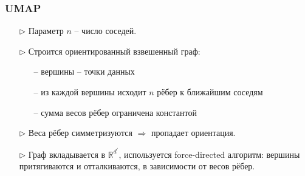 \documentclass[unicode]{beamer}
\begin{document}
\begin{frame}[t]
\frametitle{UMAP}
\begin{itemize}
\item[$\rhd$] Параметр $n$ -- число соседей.
\item[$\rhd$] Строится ориентированный взвешенный граф:
  \begin{itemize}
  \item[--] вершины -- точки данных
  \item[--] из каждой вершины исходит $n$ рёбер к ближайшим соседям
  \item[--] сумма весов рёбер ограничена константой
  \end{itemize}
\item[$\rhd$] Веса рёбер симметризуются $\Rightarrow$ пропадает ориентация.
\item[$\rhd$] Граф вкладывается в $\mathbb{R}^{d^\prime}$, используется force-directed алгоритм: вершины притягиваются и отталкиваются, в зависимости от весов рёбер.
\end{itemize}
\end{frame}
\end{document}

